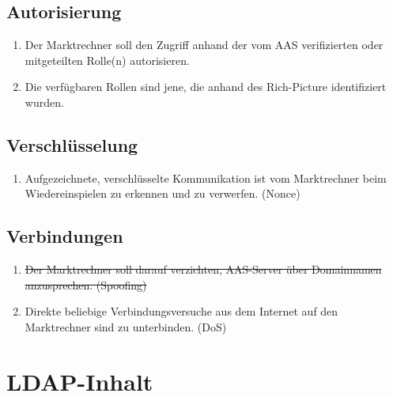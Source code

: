 \documentclass[11pt,a4paper]{report}
\begin{document}
\subsection{Autorisierung}

\begin{enumerate}
\item[\XBox] Der Marktrechner soll den Zugriff anhand der vom AAS verifizierten oder mitgeteilten Rolle(n) autorisieren.
\item[\Square] Die verfügbaren Rollen sind jene, die anhand des Rich-Picture identifiziert wurden.
\end{enumerate}

\subsection{Verschlüsselung}

\begin{enumerate}
\item[\Square] Aufgezeichnete, verschlüsselte Kommunikation ist vom Marktrechner beim Wiedereinspielen zu erkennen und zu verwerfen. (Nonce)
\end{enumerate}

\subsection{Verbindungen}

\begin{enumerate}
\item[\sout{\Square}] \sout{Der Marktrechner soll darauf verzichten, AAS-Server über Domainnamen anzusprechen. (Spoofing)}
\item[\XBox] Direkte beliebige Verbindungsversuche aus dem Internet auf den Marktrechner sind zu unterbinden. (DoS)
\end{enumerate}



\section{LDAP-Inhalt} \label{sec:a_ldap_content}
\end{document}
